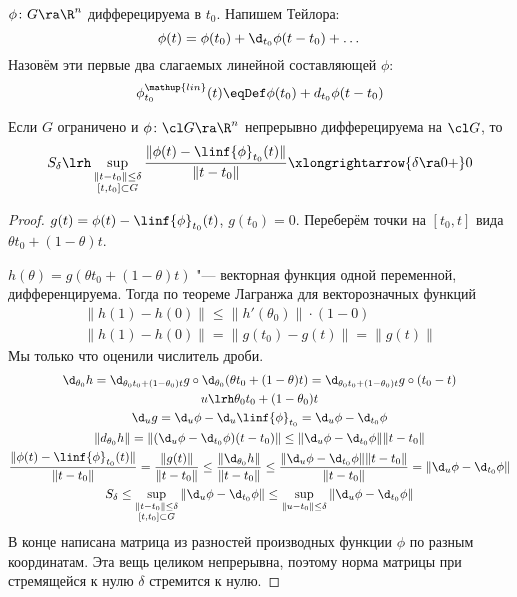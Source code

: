 \begin{Def}
	$\phi\colon G \ra \R^n$ дифферецируема в $t_0$.
	Напишем Тейлора:
	\[
		\phi(t) = \phi(t_0) + \d_{t_0} \phi(t - t_0) + \dots
	\]
	Назовём эти первые два слагаемых линейной составляющей $\phi$:
	\[
		\phi^{\mathup{lin}}_{t_0} (t) \eqDef \phi(t_0) + d_{t_0} \phi(t - t_0) 
	\]
\end{Def}

\begin{lemma}
	Если $G$ ограничено и $\phi\colon \cl G \ra \R^n$ непрерывно дифферецируема на $\cl G$, то
	\[
		S_\delta \lrh \sup_{\substack{\|t-t_0\| \le \delta \\ [t, t_0] \subset G}} \frac{\|\phi(t) - \linf{\phi}_{t_0} (t)\|}{\|t-t_0\|} \xlongrightarrow{\delta \ra 0+} 0
	\]
\end{lemma}
\begin{proof}
	$g(t) = \phi(t) - \linf{\phi}_{t_0} (t)$, $g(t_0) = 0$.
	Переберём точки на $[t_0, t]$ вида $\theta t_0 + (1-\theta) t$.

	$h(\theta) = g(\theta t_0 + (1-\theta) t)$ "--- векторная функция одной переменной, дифференцируема.
	Тогда по теореме Лагранжа для векторозначных функций
	\begin{gather*}
		\|h(1) - h(0)\| \le \|h'(\theta_0)\| \cdot (1-0) \\
		\|h(1) - h(0)\| = \|g(t_0) - g(t)\| = \|g(t)\|
	\end{gather*}
	Мы только что оценили числитель дроби.
	\begin{gather*}
		\d_{\theta_0}h = \d_{\theta_0 t_0 + (1-\theta_0) t} g \circ \d_{\theta_0} (\theta t_0 + (1-\theta) t)
			= \d_{\theta_0 t_0 + (1-\theta_0) t} g \circ (t_0 - t) \\
		u \lrh \theta_0 t_0 + (1-\theta_0) t \\
		\d_u g = \d_u \phi - \d_u \linf{\phi}_{t_0} = \d_u \phi - \d_{t_0} \phi \\
		\|d_{\theta_0} h\| = \|(\d_u \phi - \d_{t_0} \phi)(t-t_0)\| \le \|\d_u \phi - \d_{t_0} \phi\| \|t-t_0\| \\
		\frac{\|\phi(t) - \linf{\phi}_{t_0} (t)\|}{\|t-t_0\|} = \frac{\|g(t)\|}{\|t-t_0\|} \le \frac{\|\d_{\theta_0} h\|}{\|t-t_0\|}
			\le \frac{\|\d_u \phi - \d_{t_0} \phi\| \|t-t_0\|}{\|t-t_0\|} = \|\d_u \phi - \d_{t_0} \phi\| \\
		S_\delta \le \sup_{\substack{\|t-t_0\| \le \delta \\ [t, t_0] \subset G}} \|\d_u \phi - \d_{t_0} \phi\|
			\le \sup_{\|u-t_0\|\le \delta} \|\d_u \phi - \d_{t_0} \phi\|
	\end{gather*}
	В конце написана матрица из разностей производных функции $\phi$ по разным координатам.
	Эта вещь целиком непрерывна, поэтому норма матрицы при стремящейся к нулю $\delta$ стремится к нулю.
\end{proof}

